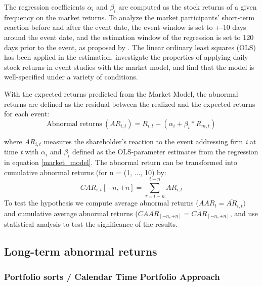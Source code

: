  The regression coefficients $\alpha_i$ and $\beta_i$ are computed as the stock returns of a given frequency on the market returns. To analyze the market participants' short-term reaction before and after the event date, the event window is set to +-10 days around the event date, and the estimation window of the regression is set to 120 days prior to the event, as proposed by \cite{Event_studies}. The linear ordinary least squares (OLS) has been applied in the estimation. \cite{brown1985using} investigate the properties of applying daily stock returns in event studies with the market model, and find that the model is well-specified under a variety of conditions. 

 With the expected returns predicted from the Market Model, the abnormal returns are defined as the residual between the realized and the expected returns for each event:
 \begin{equation}
    \text{Abnormal returns} \: (AR_{i,t}) = R_{i,t} - (\alpha_i + \beta_i * R_{m,t})
 \end{equation}

 where $AR_{i,t}$ measures the shareholder's reaction to the event addressing firm \textit{i} at time \textit{t}  with $\alpha_i$ and $\beta_i$ defined as the OLS-parameter estimates from the regression in equation \ref{market_model}. The abnormal return can be transformed into cumulative abnormal returns (for n = (1, ..., 10) by: 
 \begin{equation}
     CAR_{i,t}[-n,+n] = \sum_{\tau = t-n} ^{t+n} AR_{i,t}
 \end{equation}
 To test the hypothesis we compute average abnormal returns ($AAR_t = \overline{AR}_{i,t})$ and cumulative average abnormal returns ($CAAR_{[-n,+n]} = \overline{CAR}_{[-n,+n]}$, and use statistical analysis to test the significance of the results. 

 

\subsection{Long-term abnormal returns}

\subsubsection{Portfolio sorts / Calendar Time Portfolio Approach}





